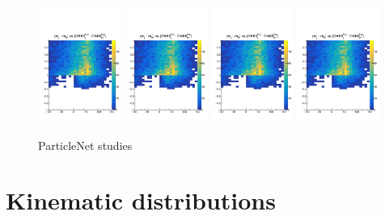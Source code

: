 \documentclass[10pt,oneside]{article}
\begin{document}
\begin{figure}[H]
    \centering
    \includegraphics[page=5,width=0.24\textwidth]{../plots/diff2Dstudy.pdf}
    \includegraphics[page=6,width=0.24\textwidth]{../plots/diff2Dstudy.pdf}
    \includegraphics[page=7,width=0.24\textwidth]{../plots/diff2Dstudy.pdf}
    \includegraphics[page=8,width=0.24\textwidth]{../plots/diff2Dstudy.pdf}
    \caption{ParticleNet studies}
    \label{figs:PN_diff_2D}
\end{figure}


\section{Kinematic distributions}
\end{document}
